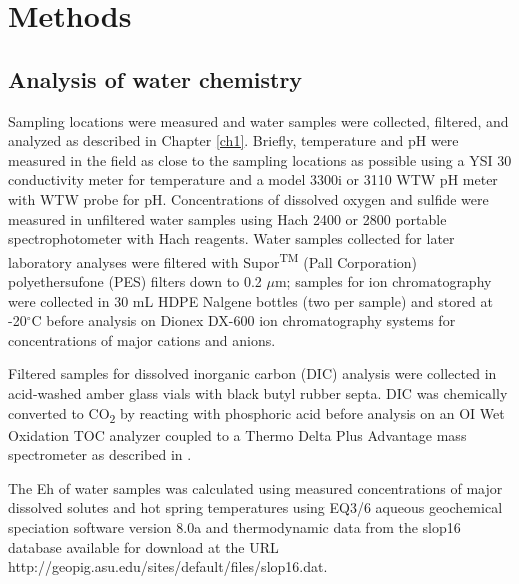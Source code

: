 \section{Methods}
\subsection{Analysis of water chemistry}
Sampling locations were measured and water samples were collected, filtered, and analyzed as described in Chapter \ref{ch1}. Briefly, temperature and pH were measured in the field as close to the sampling locations as possible using a YSI 30 conductivity meter for temperature and a model 3300i or 3110 WTW pH meter with WTW probe for pH. Concentrations of dissolved oxygen and sulfide were measured in unfiltered water samples using Hach 2400 or 2800 portable spectrophotometer with Hach reagents. Water samples collected for later laboratory analyses were filtered with Supor\textsuperscript{TM} (Pall Corporation) polyethersufone (PES) filters down to 0.2 $\mu$m; samples for ion chromatography were collected in 30 mL HDPE Nalgene bottles (two per sample) and stored at -20$^{\circ}$C before analysis on Dionex DX-600 ion chromatography systems for concentrations of major cations and anions.

Filtered samples for dissolved inorganic carbon (DIC) analysis were collected in acid-washed amber glass vials with black butyl rubber septa. DIC was chemically converted to CO\textsubscript{2} by reacting with phosphoric acid before analysis on an OI Wet Oxidation TOC analyzer coupled to a Thermo Delta Plus Advantage mass spectrometer as described in \cite{havig2011merging}.

The Eh of water samples was calculated using measured concentrations of major dissolved solutes and hot spring temperatures using EQ3/6 aqueous geochemical speciation software version 8.0a \citep{wolery2002eq3} and thermodynamic data from the slop16 database available for download at the URL http://geopig.asu.edu/sites/default/files/slop16.dat.

